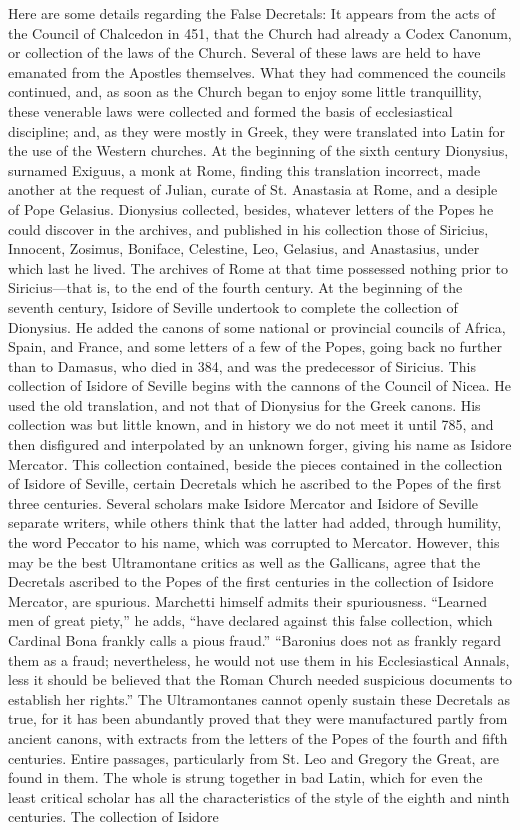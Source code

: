 Here are some details regarding the False Decretals: It appears from the acts of the Council of Chalcedon in 451, that the Church had already a Codex Canonum, or collection of the laws of the Church. Several of these laws are held to have emanated from the Apostles themselves. What they had commenced the councils continued, and, as soon as the Church began to enjoy some little tranquillity, these venerable laws were collected and formed the basis of ecclesiastical discipline; and, as they were mostly in Greek, they were translated into Latin for the use of the Western churches. At the beginning of the sixth century Dionysius, surnamed Exiguus, a monk at Rome, finding this translation incorrect, made another at the request of Julian, curate of St. Anastasia at Rome, and a desiple of Pope Gelasius. Dionysius collected, besides, whatever letters of the Popes he could discover in the archives, and published in his collection those of Siricius, Innocent, Zosimus, Boniface, Celestine, Leo, Gelasius, and Anastasius, under which last he lived. The archives of Rome at that time possessed nothing prior to Siricius—that is, to the end of the fourth century. At the beginning of the seventh century, Isidore of Seville undertook to complete the collection of Dionysius. He added the canons of some national or provincial councils of Africa, Spain, and France, and some letters of a few of the Popes, going back no further than to Damasus, who died in 384, and was the predecessor of Siricius. This collection of Isidore of Seville begins with the cannons of the Council of Nicea. He used the old translation, and not that of Dionysius for the Greek canons. His collection was but little known, and in history we do not meet it until 785, and then disfigured and interpolated by an unknown forger, giving his name as Isidore Mercator. This collection contained, beside the pieces contained in the collection of Isidore of Seville, certain Decretals which he ascribed to the Popes of the first three centuries. Several scholars make Isidore Mercator and Isidore of Seville separate writers, while others think that the latter had added, through humility, the word Peccator to his name, which was corrupted to Mercator. However, this may be the best Ultramontane critics as well as the Gallicans, agree that the Decretals ascribed to the Popes of the first centuries in the collection of Isidore Mercator, are spurious. Marchetti himself admits their spuriousness. “Learned men of great piety,” he adds, “have declared against this false collection, which Cardinal Bona frankly calls a pious fraud.” “Baronius does not as frankly regard them as a fraud; nevertheless, he would not use them in his Ecclesiastical Annals, less it should be believed that the Roman Church needed suspicious documents to establish her rights.” The Ultramontanes cannot openly sustain these Decretals as true, for it has been abundantly proved that they were manufactured partly from ancient canons, with extracts from the letters of the Popes of the fourth and fifth centuries. Entire passages, particularly from St. Leo and Gregory the Great, are found in them. The whole is strung together in bad Latin, which for even the least critical scholar has all the characteristics of the style of the eighth and ninth centuries. The collection of Isidore 